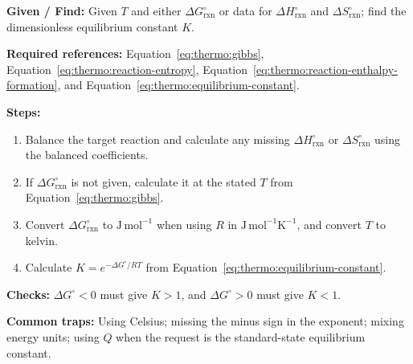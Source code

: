 \textbf{Given / Find:} Given \(T\) and either \(\Delta G^\circ_{\mathrm{rxn}}\) or data for \(\Delta H^\circ_{\mathrm{rxn}}\) and \(\Delta S^\circ_{\mathrm{rxn}}\); find the dimensionless equilibrium constant \(K\).

\textbf{Required references:} Equation~\eqref{eq:thermo:gibbs}, Equation~\eqref{eq:thermo:reaction-entropy}, Equation~\eqref{eq:thermo:reaction-enthalpy-formation}, and Equation~\eqref{eq:thermo:equilibrium-constant}.


\textbf{Steps:}
\begin{enumerate}
    \item Balance the target reaction and calculate any missing \(\Delta H^\circ_{\mathrm{rxn}}\) or \(\Delta S^\circ_{\mathrm{rxn}}\) using the balanced coefficients.
    \item If \(\Delta G^\circ_{\mathrm{rxn}}\) is not given, calculate it at the stated \(T\) from Equation~\eqref{eq:thermo:gibbs}.
    \item Convert \(\Delta G^\circ_{\mathrm{rxn}}\) to \(\mathrm{J\,mol^{-1}}\) when using \(R\) in \(\mathrm{J\,mol^{-1}K^{-1}}\), and convert \(T\) to kelvin.
    \item Calculate \(K=e^{-\Delta G^\circ/RT}\) from Equation~\eqref{eq:thermo:equilibrium-constant}.
\end{enumerate}

\textbf{Checks:} \(\Delta G^\circ<0\) must give \(K>1\), and \(\Delta G^\circ>0\) must give \(K<1\).

\textbf{Common traps:} Using Celsius; missing the minus sign in the exponent; mixing energy units; using \(Q\) when the request is the standard-state equilibrium constant.

